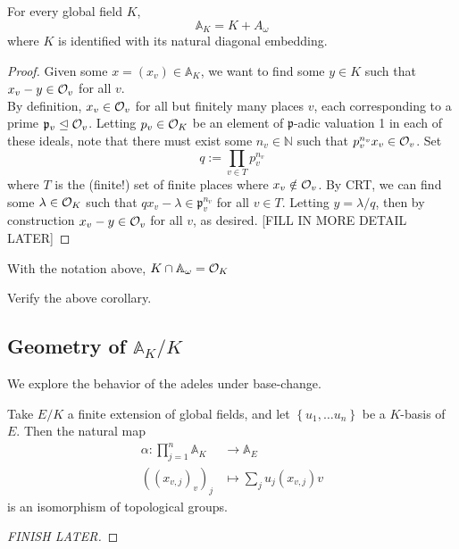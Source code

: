 \documentclass[11pt, x11names, openany]{book}
\newcommand{\nn}{\mathbb{N}}
\renewcommand{\aa}{\mathbb{A}}
\newcommand{\pp}{\mathfrak{p}}
\newcommand{\set}[1]{\left\{ #1 \right\}}
\newcommand{\ideal}{\trianglelefteq}
\begin{document}
\begin{theorem}[Approximation]
\label{Approximation Theorem}
For every global field $K$,
\begin{equation*}
    \aa_K = K + A_\omega
\end{equation*}
where $K$ is identified with its natural diagonal embedding.
\end{theorem}
\begin{proof}
Given some $x = (x_v) \in \aa_K$, we want to find some $y \in K$ such that $x_v - y \in \mathcal{O}_v$ for all $v$.\\
By definition, $x_v \in \mathcal{O}_v$ for all but finitely many places $v$, each corresponding to a prime $\pp_v \ideal \calo_v$. Letting $p_v \in \mathcal{O}_K$ be an element of $\pp$-adic valuation 1 in each of these ideals, note that there must exist some $n_v \in \nn$ such that $p_v^{n_v}x_v \in \mathcal{O}_v$. Set 
\begin{equation*}
    q := \prod_{v \in T} p_v^{n_v} 
\end{equation*}
where $T$ is the (finite!) set of finite places where $x_v \notin \mathcal{O}_v$. By CRT, we can find some $\lambda \in \mathcal{O}_K$ such that $qx_v - \lambda \in \pp_v^{n_v}$ for all $v \in T$. Letting $y = \lambda/q$, then by construction $x_v - y \in \mathcal{O}_v$ for all $v$, as desired. [FILL IN MORE DETAIL LATER]
\end{proof}
\begin{corollary}
    With the notation above, $K \cap \aa_\omega = \calo_K$
\end{corollary}
\begin{sanitycheck}
    Verify the above corollary.
\end{sanitycheck}

\subsection{Geometry of $\aa_K/K$}
\label{subsection: Geometry of A_K/K}
We explore the behavior of the adeles under base-change.
\begin{lemma}
\label{A_K/K Lemma}
Take $E/K$ a finite extension of global fields, and let $\set{u_1, \ldots u_n}$ be a $K$-basis of $E$. Then the natural map
\begin{equation*}
    \begin{split}
    \alpha: \prod^n_{j=1} \aa_K &\to \aa_E\\
    ((x_{v, j})_v)_j &\mapsto \sum_j u_j(x_{v, j})v
    \end{split}
\end{equation*}
is an isomorphism of topological groups.
\end{lemma}
\begin{proof}
[FINISH LATER]
\end{proof}
\end{document}
